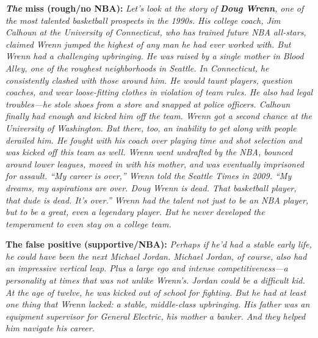 \documentclass[]{book}
\theoremstyle{definition}
\theoremstyle{definition}
\theoremstyle{definition}
\theoremstyle{remark}
\begin{document}
\textbf{\emph{The} miss (rough/no NBA):} \emph{Let's look at the story
of \textbf{Doug Wrenn}, one of the most talented basketball prospects in
the 1990s. His college coach, Jim Calhoun at the University of
Connecticut, who has trained future NBA all-stars, claimed Wrenn jumped
the highest of any man he had ever worked with. But Wrenn had a
challenging upbringing. He was raised by a single mother in Blood Alley,
one of the roughest neighborhoods in Seattle. In Connecticut, he
consistently clashed with those around him. He would taunt players,
question coaches, and wear loose-fitting clothes in violation of team
rules. He also had legal troubles---he stole shoes from a store and
snapped at police officers. Calhoun finally had enough and kicked him
off the team. Wrenn got a second chance at the University of Washington.
But there, too, an inability to get along with people derailed him. He
fought with his coach over playing time and shot selection and was
kicked off this team as well. Wrenn went undrafted by the NBA, bounced
around lower leagues, moved in with his mother, and was eventually
imprisoned for assault. ``My career is over,'' Wrenn told the Seattle
Times in 2009. ``My dreams, my aspirations are over. Doug Wrenn is dead.
That basketball player, that dude is dead. It's over.'' Wrenn had the
talent not just to be an NBA player, but to be a great, even a legendary
player. But he never developed the temperament to even stay on a college
team.}

\textbf{The false positive (supportive/NBA):} \emph{Perhaps if he'd had
a stable early life, he could have been the next Michael Jordan. Michael
Jordan, of course, also had an impressive vertical leap. Plus a large
ego and intense competitiveness---a personality at times that was not
unlike Wrenn's. Jordan could be a difficult kid. At the age of twelve,
he was kicked out of school for fighting. But he had at least one thing
that Wrenn lacked: a stable, middle-class upbringing. His father was an
equipment supervisor for General Electric, his mother a banker. And they
helped him navigate his career.}
\end{document}

